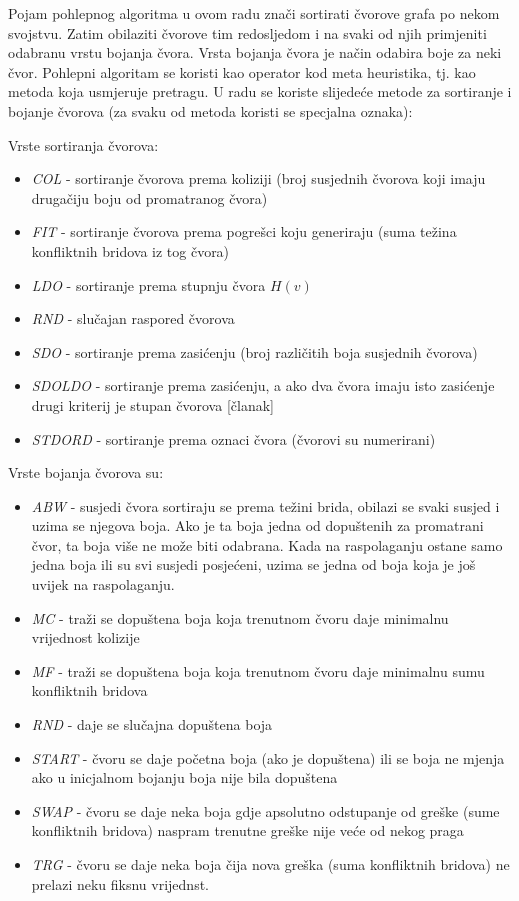 \documentclass[times, utf8, diplomski, numeric]{fer}
\begin{document}
Pojam pohlepnog algoritma u ovom radu znači sortirati čvorove grafa po nekom svojstvu. Zatim obilaziti čvorove tim redosljedom i na svaki od njih primjeniti odabranu vrstu bojanja čvora. Vrsta bojanja čvora je način odabira boje za neki čvor. Pohlepni algoritam se koristi kao operator kod meta heuristika, tj. kao metoda koja usmjeruje pretragu.
U radu se koriste slijedeće metode za sortiranje i bojanje čvorova (za svaku od metoda koristi se specjalna oznaka):

Vrste sortiranja čvorova:

\begin{itemize}
	\item \emph{COL} - sortiranje čvorova prema koliziji (broj susjednih čvorova koji imaju drugačiju boju od promatranog čvora)
	\item \emph{FIT} - sortiranje čvorova prema pogrešci koju generiraju (suma težina konfliktnih bridova iz tog čvora)
	\item \emph{LDO} - sortiranje prema stupnju čvora $H(v)$
	\item \emph{RND} - slučajan raspored čvorova
	\item \emph{SDO} - sortiranje prema zasićenju (broj različitih boja susjednih čvorova)
	\item \emph{SDOLDO} - sortiranje prema zasićenju, a ako dva čvora imaju isto zasićenje drugi kriterij je stupan čvorova [članak]
	\item \emph{STDORD} - sortiranje prema oznaci čvora (čvorovi su numerirani)
\end{itemize}

Vrste bojanja čvorova su:

\begin{itemize}
	\item \emph{ABW} - susjedi čvora sortiraju se prema težini brida, obilazi se svaki susjed i uzima se njegova boja. Ako je ta boja jedna od dopuštenih za promatrani čvor, ta boja više ne može biti odabrana. Kada na raspolaganju ostane samo jedna boja ili su svi susjedi posjećeni, uzima se jedna od boja koja je još uvijek na raspolaganju. 
	\item \emph{MC} - traži se dopuštena boja koja trenutnom čvoru daje minimalnu vrijednost kolizije
	\item \emph{MF} - traži se dopuštena boja koja trenutnom čvoru daje minimalnu sumu konfliktnih bridova
	\item \emph{RND} - daje se slučajna dopuštena boja
	\item \emph{START} - čvoru se daje početna boja (ako je dopuštena) ili se boja ne mjenja ako u inicjalnom bojanju boja nije bila dopuštena
	\item \emph{SWAP} - čvoru se daje neka boja gdje apsolutno odstupanje od greške (sume konfliktnih bridova) naspram trenutne greške nije veće od nekog praga
	\item \emph{TRG} - čvoru se daje neka boja čija nova greška (suma konfliktnih bridova) ne prelazi neku fiksnu vrijednst. 
\end{itemize}
\end{document}
